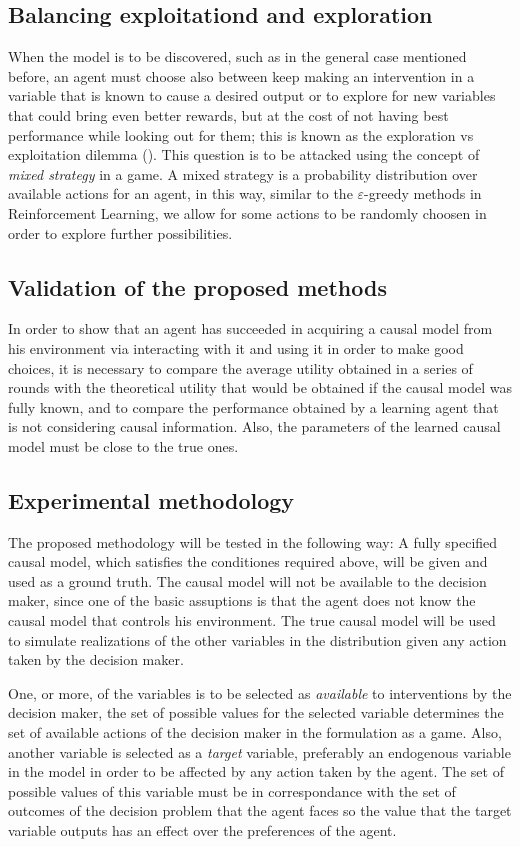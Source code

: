 \documentclass[english,letterpaper,12pt,final]{article}
\theoremstyle{definition}
\begin{document}
\subsection{Balancing exploitationd and exploration}
When the model is to be discovered, such as in the general case mentioned before, an agent must choose also between keep making an intervention in a variable that is known to cause a desired output or to explore for new variables that could bring even better rewards, but at the cost of not having best performance while looking out for them; this is known as the exploration vs exploitation dilemma (\cite{sutton1998reinforcement}). This question is to be attacked using the concept of \textit{mixed strategy} in a game. A mixed strategy is a probability distribution over available actions for an agent, in this way, similar to the $\varepsilon$-greedy methods in Reinforcement Learning, we allow for some actions to be randomly choosen in order to explore further possibilities.

\subsection{Validation of the proposed methods}
In order to show that an agent has succeeded in acquiring a causal model from his environment via interacting with it and using it in order to make good choices, it is necessary to compare the average utility obtained in a series of rounds with the theoretical utility that would be obtained if the causal model was fully known, and to compare the performance obtained by a learning agent that is not considering causal information. Also, the parameters of the learned causal model must be close to the true ones.


\subsection{Experimental methodology}
The proposed methodology will be tested in the following way: A fully specified causal model, which satisfies the conditiones required above, will be given and used as a ground truth. The causal model will not be available to the decision maker, since one of the basic assuptions is that the agent does not know the causal model that controls his environment. The true causal model will be used to simulate realizations of the other variables in the distribution given any action taken by the decision maker.

One, or more, of the variables is to be selected as \textit{available} to interventions by the decision maker, the set of possible values for the selected variable determines the set of available actions of the decision maker in the formulation as a game. Also, another variable is selected as a \textit{target} variable, preferably an endogenous variable in the model in order to be affected by any action taken by the agent. The set of possible values of this variable must be in correspondance with the set of outcomes of the decision problem that the agent faces so the value that the target variable outputs has an effect over the preferences of the agent. 
\end{document}
